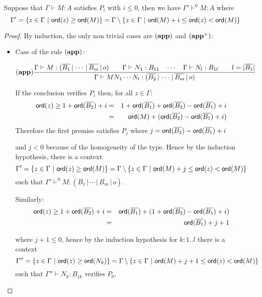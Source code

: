 \begin{lem}
\label{lem:restriction}

Suppose that $\Gamma \vdash M : A$ satisfies $P_i$ with $i\leq0$, then we have
$\Gamma' \vdash^{0} M : A$ where $$\Gamma' = \{ z \in \Gamma \ |
\ \ord{z} \geq \ord{M} \} = \Gamma \setminus \{ z \in \Gamma \ | \ \ord{M} + i \leq \ord{z} < \ord{M} \}$$
\end{lem}
\begin{proof}
By induction, the only non trivial cases are $\mathbf{(app)}$ and $\mathbf{(app^+)}$:
\begin{itemize}
\item Case of the rule $\mathbf{(app)}$:

    \[ (\mathbf{app})
    \frac{\displaystyle {{\Gamma} \vdash {M : (\overline{B_1} \, | \, \cdots \, | \, \overline{B_m} \, | \, o)}} \qquad
            {{\Gamma} \vdash {N_1 : B_{11}}} \quad \cdots \quad {{\Gamma} \vdash {N_{l} :
            B_{1l}}} \qquad l = |\overline{B_1}| }{ {{\Gamma} \vdash {M N_1
            \cdots N_{l} : (\overline{B_2} \, | \, \cdots \, | \,
            \overline{B_m} \, | \, o)}}}
    \]

    If the conclusion verifies $P_i$ then, for all $z \in \Gamma$:
    \begin{eqnarray*}
    {\sf ord}(z) \geq 1 + {\sf ord}(\overline{B_2}) + i
    &=& 1 + {\sf ord}(\overline{B_1}) + {\sf ord}(\overline{B_2}) - {\sf ord}(\overline{B_1}) + i \\
    &=& {\sf ord}(M) + ({\sf ord}(\overline{B_2}) - {\sf ord}(\overline{B_1}) + i)
    \end{eqnarray*}
    Therefore the first premise satisfies $P_j$ where $j={{\sf ord}(\overline{B_2}) - {\sf ord}(\overline{B_1}) + i}$

    and $j< 0$ because of the homogeneity of the type. Hence by the induction hypothesis,
    there is a context $$\Gamma' = \{ z \in \Gamma \ |
    \ \ord{z} \geq \ord{M} \} = \Gamma \setminus \{ z \in \Gamma \ | \ \ord{M} + j \leq \ord{z} < \ord{M} \}$$
    such that $\Gamma' \vdash^{0} M : (\overline{B_1} \, | \, \cdots \, | \, \overline{B_m} \, | \, o)$.


    Similarly:
    \begin{eqnarray*}
    {\sf ord}(z) \geq 1 + {\sf ord}(\overline{B_2}) + i
    &=& {\sf ord}(\overline{B_1}) + (1+{\sf ord}(\overline{B_2}) - {\sf ord}(\overline{B_1}) + i) \\
    &=& {\sf ord}(\overline{B_1}) + j+1
    \end{eqnarray*}

    where $j+1\leq 0$, hence by the induction hypothesis for $k : 1..l$ there is a
    context $$\Gamma'' = \{ z \in \Gamma \ |
    \ \ord{z} \geq \ord{N_k} \} = \Gamma \setminus \{ z \in \Gamma \ | \ \ord{M} + j+1 \leq \ord{z} < \ord{M} \}$$
    such that $\Gamma'' \vdash N_k : B_{1k}$ verifies $P_0$.


\end{itemize}
\end{proof}
